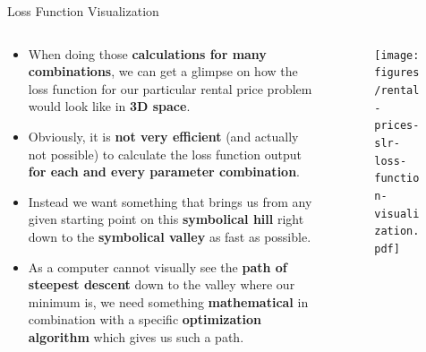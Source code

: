 \documentclass[document.tex]{subfiles}
\begin{document}
    \begin{frame}{Loss Function Visualization}
        \begin{columns}
            \begin{column}{0.6\textwidth}
                \begin{itemize}
                    \item When doing those \textbf{calculations for many combinations}, we can get a glimpse on how the loss function for our particular rental price problem would look like in \textbf{3D space}.
                    \item Obviously, it is \textbf{not very efficient} (and actually not possible) to calculate the loss function output \textbf{for each and every parameter combination}.
                    \item Instead we want something that brings us from any given starting point on this \textbf{symbolical hill} right down to the \textbf{symbolical valley} as fast as possible.
                    \item As a computer cannot visually see the \textbf{path of steepest descent} down to the valley where our minimum is, we need something \textbf{mathematical} in combination with a specific \textbf{optimization algorithm} which gives us such a path.
                \end{itemize}
            \end{column}
            \begin{column}{0.4\textwidth}
                \begin{figure}
                    \label{fig:rental-prices-slr-loss-function-visualization}
                    \texttt{[image: figures/rental-prices-slr-loss-function-visualization.pdf]}
                \end{figure}
            \end{column}
        \end{columns}
    \end{frame}
\end{document}
